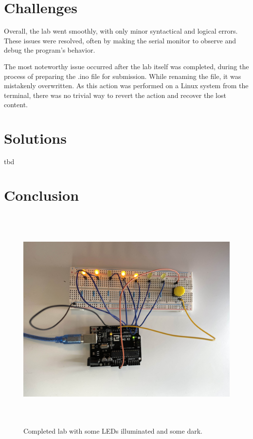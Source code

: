\documentclass[fleqn]{article}
\begin{document}
\section{Challenges}
Overall, the lab went smoothly, with only minor syntactical and logical errors. These issues were resolved, often by making the serial monitor to observe and debug the program's behavior.

The most noteworthy issue occurred after the lab itself was completed, during the process of preparing the .ino file for submission. While renaming the file, it was mistakenly overwritten. As this action was performed on a Linux system from the terminal, there was no trivial way to revert the action and recover the lost content. 
\section{Solutions}

tbd
\section{Conclusion}
    \begin{figure}[H]
        \centering
        \includegraphics[width=6in,height=4.5in]{arduino_lab_1_img.jpg}
        \caption{Completed lab with some LEDs illuminated and some dark.}
    \end{figure}
\end{document}
